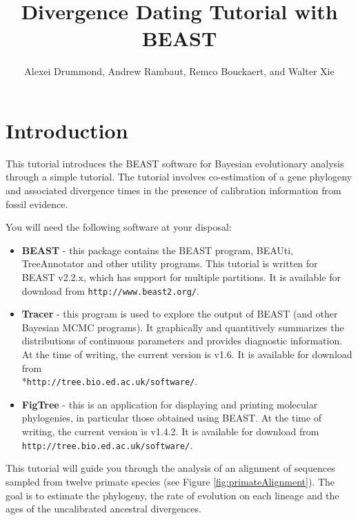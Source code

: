 \documentclass[11pt]{article}
\title{Divergence Dating Tutorial with BEAST {\BEASTVersion}}
\author{Alexei Drummond, Andrew Rambaut, Remco Bouckaert, and Walter Xie}
\newcommand{\BEASTVersion}{2.2.x}
\newcommand{\TracerVersion}{1.6}
\newcommand{\FigTreeVersion}{1.4.2}
\theoremstyle{plain}%
\theoremstyle{definition}
\theoremstyle{remark}
\begin{document}
\maketitle

\section{Introduction}

This tutorial introduces the BEAST software for Bayesian evolutionary analysis through a simple tutorial. The tutorial involves co-estimation of a gene phylogeny and associated divergence times in the presence of calibration information from fossil evidence. 

You will need the following software at your disposal:

\begin{itemize}

\item {\bf BEAST} - this package contains the BEAST program, BEAUti, TreeAnnotator and other utility programs. This tutorial is written for BEAST v{\BEASTVersion}, which has support for multiple partitions. It is available for download from \texttt{http://www.beast2.org/}.
\item {\bf Tracer} - this program is used to explore the output of BEAST (and other Bayesian MCMC programs). It graphically and
quantitively summarizes the distributions of continuous parameters and provides diagnostic information. At the time of
writing, the current version is v{\TracerVersion}. It is available for download from\\*\texttt{http://tree.bio.ed.ac.uk/software/}.
\item {\bf FigTree} - this is an application for displaying and printing molecular phylogenies, in particular those obtained using
BEAST. At the time of writing, the current version is v{\FigTreeVersion}. It is available for download from \texttt{http://tree.bio.ed.ac.uk/software/}.
\end{itemize}



This tutorial will guide you through the analysis of an alignment of sequences sampled from twelve primate species (see Figure \ref{fig:primateAlignment}). The goal is to estimate the phylogeny, the rate of evolution on each lineage and the ages of the uncalibrated
ancestral divergences. 
\end{document}
